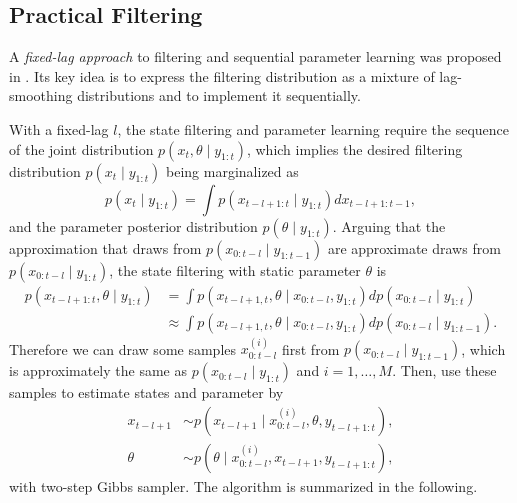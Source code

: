 \subsection{Practical Filtering}

A \textit{fixed-lag approach} to filtering and sequential parameter learning was proposed in \citep{polson2008practical}. Its key idea is to express the filtering distribution as a mixture of lag-smoothing distributions and to implement it sequentially. 

With a fixed-lag $l$, the state filtering and parameter learning require the sequence of the joint distribution $p(x_t,\theta\mid y_{1:t})$, which implies the desired filtering distribution $p(x_t\mid y_{1:t})$ being marginalized as 
\begin{equation*}
p(x_t\mid y_{1:t}) = \int p(x_{t-l+1:t}\mid y_{1:t}) dx_{t-l+1:t-1},
\end{equation*}
and the parameter posterior distribution $p(\theta\mid y_{1:t})$. Arguing that the approximation that draws from $p(x_{0:t-l}\mid y_{1:t-1})$ are approximate draws from $p(x_{0:t-l}\mid y_{1:t})$, the state filtering with static parameter $\theta$ is 
\begin{align*}
p(x_{t-l+1:t},\theta\mid y_{1:t}) &=\int p(x_{t-l+1,t},\theta \mid x_{0:t-l},y_{1:t}) dp(x_{0:t-l}\mid y_{1:t}) \\
&\approx \int p(x_{t-l+1,t},\theta \mid x_{0:t-l},y_{1:t}) dp(x_{0:t-l}\mid y_{1:t-1}).
\end{align*}
Therefore we can draw some samples $x_{0:t-l}^{(i)}$ first from $p(x_{0:t-l}\mid y_{1:t-1})$, which is approximately the same as $p(x_{0:t-l}\mid y_{1:t})$ and $i=1,\ldots,M$. Then, use these samples to estimate states and parameter by 
\begin{align*}
x_{t-l+1} &\sim p\left(x_{t-l+1}\mid x_{0:t-l}^{(i)},\theta,y_{t-l+1:t}\right),\\
\theta &\sim p\left(\theta \mid x_{0:t-l}^{(i)},x_{t-l+1},y_{t-l+1:t}\right),
\end{align*}
with two-step Gibbs sampler. The algorithm is summarized in the following. 
